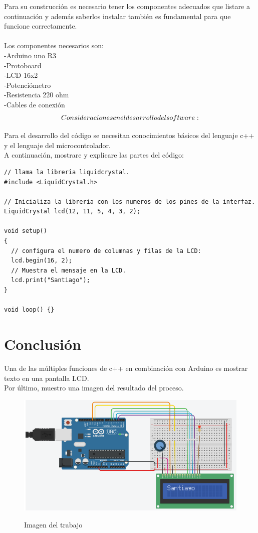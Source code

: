 \documentclass{article}
\begin{document}
Para su construcción es necesario tener los componentes adecuados que listare a continuación y además saberlos instalar también es fundamental para que funcione correctamente.\\
\\ Los componentes necesarios son: \\
-Arduino uno R3\\
-Protoboard\\
-LCD 16x2\\
-Potenciómetro\\
-Resistencia 220 ohm\\
-Cables de conexión\\

\vspace{0,5cm}
        \begin{align}

        \LARGE
        Consideraciones en el desarrollo del software:
        
        \end{align}
\vspace{0,2cm}

Para el desarrollo del código se necesitan conocimientos básicos del lenguaje c++ y el lenguaje del microcontrolador.\\
A continuación, mostrare y explicare las partes del código:

\vspace{2cm}

\begin{lstlisting}
// llama la libreria liquidcrystal.
#include <LiquidCrystal.h>

// Inicializa la libreria con los numeros de los pines de la interfaz.
LiquidCrystal lcd(12, 11, 5, 4, 3, 2);

void setup() 
{
  // configura el numero de columnas y filas de la LCD:
  lcd.begin(16, 2);
  // Muestra el mensaje en la LCD.
  lcd.print("Santiago");
}

void loop() {}
\end{lstlisting}


\section{Conclusión} \label{conclulsion}
Una de las múltiples funciones de c++ en combinación con Arduino es mostrar texto en una pantalla LCD.\\
Por último, muestro una imagen del resultado del proceso.

\begin{figure}[h]
\includegraphics[width=12cm]{Captura.PNG}
\centering
\caption{Imagen del trabajo} \cite{webpage}
\label{fig:cpplogo}
\end{figure}


\end{document}
